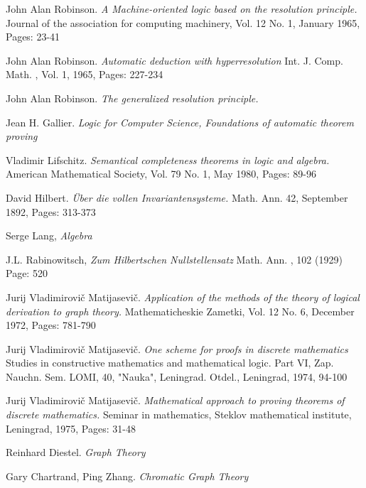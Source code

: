 \documentclass[a4paper,12pt,oneside]{book}
\begin{document}
\newpage
{}
{}
\begin{thebibliography}{9}

 
John Alan Robinson.  
\textit{A Machine-oriented logic based on the resolution principle.} 
Journal of the association for computing machinery, Vol. 12 No. 1, January 1965, Pages: 23-41

John Alan Robinson.  
\textit{Automatic deduction with hyperresolution} 
Int. J. Comp. Math. , Vol. 1, 1965, Pages: 227-234
 
John Alan Robinson.  
\textit{The generalized resolution principle.} 


 Jean H. Gallier. \textit{Logic for Computer Science, Foundations of automatic theorem proving }

Vladimir Lifschitz.
\textit{Semantical completeness theorems in logic and algebra.} 
American Mathematical Society, Vol. 79 No. 1, May 1980, Pages: 89-96 

David Hilbert. \textit{\"Uber die vollen Invariantensysteme.} Math. Ann. 42, September 1892, Pages: 313-373



Serge Lang, \textit{Algebra}

J.L. Rabinowitsch, \textit{Zum Hilbertschen Nullstellensatz} Math. Ann. , 102 (1929) Page: 520
 
Jurij Vladimirovi\v{c} Matijasevi\v{c}.
\textit{Application of the methods of the theory of logical derivation to graph theory.} Mathematicheskie Zametki, Vol. 12 No. 6, December 1972, Pages: 781-790

Jurij Vladimirovi\v{c} Matijasevi\v{c}.
\textit{One scheme for proofs in discrete mathematics} Studies in constructive mathematics and mathematical logic. Part VI, Zap. Nauchn. Sem. LOMI, 40, "Nauka", Leningrad. Otdel., Leningrad, 1974, 94-100 


Jurij Vladimirovi\v{c} Matijasevi\v{c}.
\textit{Mathematical approach to proving theorems of discrete mathematics.} 
Seminar in mathematics, Steklov mathematical institute, Leningrad, 1975, Pages: 31-48

 Reinhard Diestel. \textit{Graph Theory}




 Gary Chartrand, Ping Zhang. \textit{Chromatic Graph Theory}


\end{thebibliography}
\end{document}
